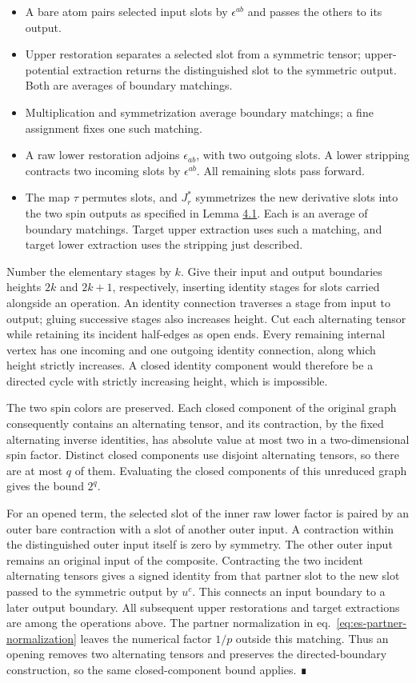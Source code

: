 \documentclass[
  english,
  11pt,
  reqno]{amsart}
\providecommand{\tightlist}{%
  \setlength{\itemsep}{0pt}\setlength{\parskip}{0pt}}
\begin{document}
\begin{itemize}
\tightlist
\item
  A bare atom pairs selected input slots by \(\epsilon^{ab}\) and passes
  the others to its output.
\item
  Upper restoration separates a selected slot from a symmetric tensor;
  upper-potential extraction returns the distinguished slot to the
  symmetric output. Both are averages of boundary matchings.
\item
  Multiplication and symmetrization average boundary matchings; a fine
  assignment fixes one such matching.
\item
  A raw lower restoration adjoins \(\epsilon_{ab}\), with two outgoing
  slots. A lower stripping contracts two incoming slots by
  \(\epsilon^{ab}\). All remaining slots pass forward.
\item
  The map \(\tau\) permutes slots, and \(J_r^*\) symmetrizes the new
  derivative slots into the two spin outputs as specified in Lemma
  \hyperref[lem:es-spencer]{4.1}. Each is an average of boundary
  matchings. Target upper extraction uses such a matching, and target
  lower extraction uses the stripping just described.
\end{itemize}

Number the elementary stages by \(k\). Give their input and output
boundaries heights \(2k\) and \(2k+1\), respectively, inserting identity
stages for slots carried alongside an operation. An identity connection
traverses a stage from input to output; gluing successive stages also
increases height. Cut each alternating tensor while retaining its
incident half-edges as open ends. Every remaining internal vertex has
one incoming and one outgoing identity connection, along which height
strictly increases. A closed identity component would therefore be a
directed cycle with strictly increasing height, which is impossible.

The two spin colors are preserved. Each closed component of the original
graph consequently contains an alternating tensor, and its contraction,
by the fixed alternating inverse identities, has absolute value at most
two in a two-dimensional spin factor. Distinct closed components use
disjoint alternating tensors, so there are at most \(q\) of them.
Evaluating the closed components of this unreduced graph gives the bound
\(2^q\).

For an opened term, the selected slot of the inner raw lower factor is
paired by an outer bare contraction with a slot of another outer input.
A contraction within the distinguished outer input itself is zero by
symmetry. The other outer input remains an original input of the
composite. Contracting the two incident alternating tensors gives a
signed identity from that partner slot to the new slot passed to the
symmetric output by \(u^c\). This connects an input boundary to a later
output boundary. All subsequent upper restorations and target
extractions are among the operations above. The partner normalization in
eq.~\ref{eq:es-partner-normalization} leaves the numerical factor
\(1/p\) outside this matching. Thus an opening removes two alternating
tensors and preserves the directed-boundary construction, so the same
closed-component bound applies. ∎
\end{document}
